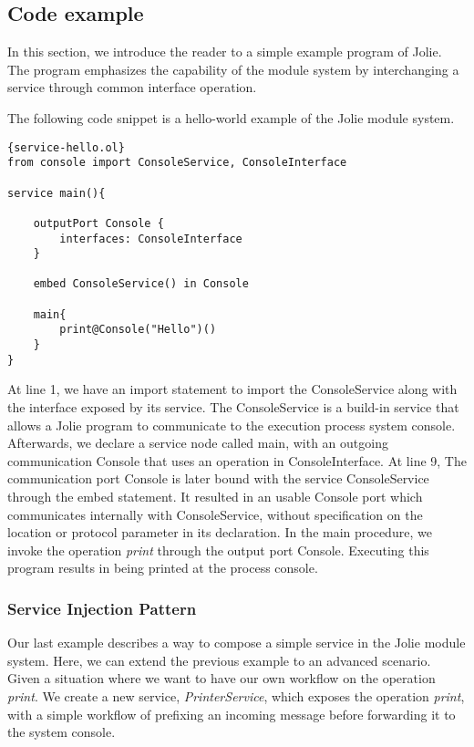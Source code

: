 \subsection{Code example}

In this section, we introduce the reader to a simple example program of Jolie. The program emphasizes the capability of the module system by interchanging a service through common interface operation.  

The following code snippet is a hello-world example of the Jolie module system.

\begin{listing}[H]
    \lstset{language=Jolie,
        style=codeStyle,
        numbers=left,
        firstnumber=1
    }
    \begin{lstlisting}[frame=tlrb]{service-hello.ol}
from console import ConsoleService, ConsoleInterface

service main(){

    outputPort Console {
        interfaces: ConsoleInterface
    }

    embed ConsoleService() in Console

    main{
        print@Console("Hello")()
    }
}
\end{lstlisting}

\end{listing}

At line 1, we have an import statement to import the ConsoleService along with the interface exposed by its service. The ConsoleService is a build-in service that allows a Jolie program to communicate to the execution process system console. Afterwards, we declare a service node called main, with an outgoing communication Console that uses an operation in ConsoleInterface. At line 9, The communication port Console is later bound with the service ConsoleService through the embed statement. It resulted in an usable Console port which communicates internally with ConsoleService, without specification on the location or protocol parameter in its declaration.
In the main procedure, we invoke the operation \textit{print} through the output port Console. Executing this program results in  being printed at the process console.

\subsubsection{Service Injection Pattern}

Our last example describes a way to compose a simple service in the Jolie module system. Here, we can extend the previous example to an advanced scenario. Given a situation where we want to have our own workflow on the operation \textit{print}. We create a new service, \textit{PrinterService}, which exposes the operation \textit{print}, with a simple workflow of prefixing an incoming message before forwarding it to the system console.

